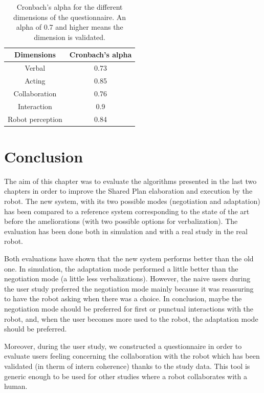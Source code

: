 \documentclass[english,a4paper,11pt,twoside]{StyleThese}
\begin{document}
\begin{table}[!h]
\centering
  \begin{tabular}{|c|c|}
  \hline
    \textbf{Dimensions} & \textbf{Cronbach's alpha} \\
  \hline
  	Verbal & 0.73 \\
  \hline
  	Acting & 0.85 \\
  \hline
  	Collaboration & 0.76 \\
  \hline
  	Interaction & 0.9 \\
  \hline
  	Robot perception & 0.84 \\
  \hline
  \end{tabular}
   \caption{Cronbach's alpha for the different dimensions of the questionnaire. An alpha of 0.7 and higher means the dimension is validated.}
   \label{tab:validationQuestionnaire}
\end{table}

\newpage
\section{Conclusion}

The aim of this chapter was to evaluate the algorithms presented in the last two chapters in order to improve the Shared Plan elaboration and execution by the robot. The new system, with its two possible modes (negotiation and adaptation) has been compared to a reference system corresponding to the state of the art before the ameliorations (with two possible options for verbalization). The evaluation has been done both in simulation and with a real study in the real robot. 

Both evaluations have shown that the new system performs better than the old one. In simulation, the adaptation mode performed a little better than the negotiation mode (a little less verbalizations). However, the naive users during the user study preferred the negotiation mode mainly because it was reassuring to have the robot asking when there was a choice. In conclusion, maybe the negotiation mode should be preferred for first or punctual interactions with the robot, and, when the user becomes more used to the robot, the adaptation mode should be preferred.

Moreover, during the user study, we constructed a questionnaire in order to evaluate users feeling concerning the collaboration with the robot which has been validated (in therm of intern coherence) thanks to the study data. This tool is generic enough to be used for other studies where a robot collaborates with a human.

\ifdefined{}
\else


\end{document}
